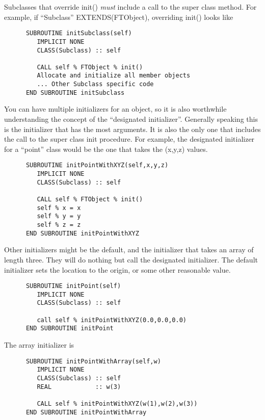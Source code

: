 \documentclass[9pt]{article}
\begin{document}
 Subclasses that override init() \emph{must} include 
 a call to the super class method. For example, if ``Subclass'' EXTENDS(FTObject), overriding init() looks like

{\color{blue}\begin{verbatim}
      SUBROUTINE initSubclass(self) 
         IMPLICIT NONE
         CLASS(Subclass) :: self
         
         CALL self % FTObject % init()
         Allocate and initialize all member objects
         ... Other Subclass specific code
      END SUBROUTINE initSubclass
\end{verbatim}}

You can have multiple initializers for an object, so it is also worthwhile understanding the concept of the ``designated initializer''. Generally speaking this is the
initializer that has the most arguments. It is also the only one that includes the call to the super class init procedure. For example, the designated initializer for a ``point'' class would be the one that takes the (x,y,z) values.

{\color{blue}\begin{verbatim}
      SUBROUTINE initPointWithXYZ(self,x,y,z) 
         IMPLICIT NONE
         CLASS(Subclass) :: self
         
         CALL self % FTObject % init()
         self % x = x
         self % y = y
         self % z = z
      END SUBROUTINE initPointWithXYZ
\end{verbatim}}

Other initializers might be the default, and the initializer that takes an array of length three. They will
do nothing but call the designated initializer. The default initializer sets the location to the origin, or some other
reasonable value.

{\color{blue}\begin{verbatim}
      SUBROUTINE initPoint(self) 
         IMPLICIT NONE
         CLASS(Subclass) :: self
         
         call self % initPointWithXYZ(0.0,0.0,0.0)
      END SUBROUTINE initPoint
\end{verbatim}}

The array initializer is
{\color{blue}\begin{verbatim}
      SUBROUTINE initPointWithArray(self,w) 
         IMPLICIT NONE
         CLASS(Subclass) :: self
         REAL            :: w(3)
         
         CALL self % initPointWithXYZ(w(1),w(2),w(3))
      END SUBROUTINE initPointWithArray
\end{verbatim}}
\end{document}
